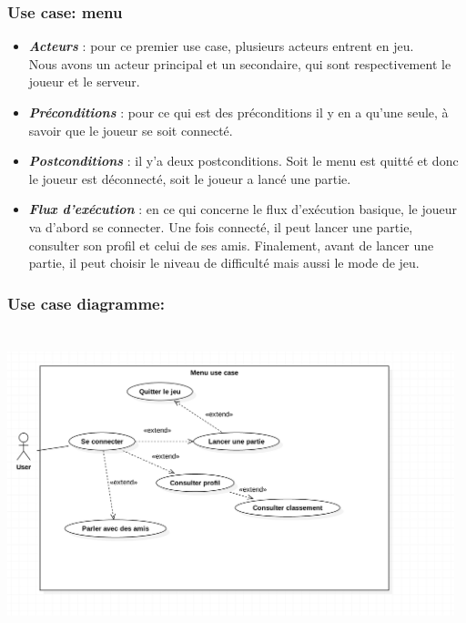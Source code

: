 \documentclass[10pt,a4paper]{article}
\begin{document}
\subsubsection{Use case: menu}
\par
\begin{itemize}
\item \textit{\textbf{Acteurs}} : pour ce premier use case, plusieurs acteurs entrent en jeu.\\
	Nous avons un acteur principal et un secondaire, qui sont respectivement le \gls{joueur} et le \gls{serveur}.\\

\item \textit{\textbf{Préconditions}} :  pour ce qui est des préconditions il y en a qu'une seule, à savoir que le \gls{joueur} se soit connecté.\\

\item \textit{\textbf{Postconditions}} : il y'a deux postconditions. Soit le menu est quitté et donc le \gls{joueur} est déconnecté, soit le \gls{joueur} a lancé une partie.\\

\item \textit{\textbf{Flux d'exécution}} : en ce qui concerne le flux d'exécution basique, le \gls{joueur} va d'abord se connecter. Une fois connecté, il peut lancer une partie, consulter son profil et celui de ses amis. Finalement, avant de lancer une partie, il peut choisir le niveau de difficulté mais aussi le mode de jeu.

\end{itemize}    
\newpage
\subsubsection{Use case diagramme:}
\begin{center}
    \includegraphics[height=9cm,width=13cm]{menu_use_case.png}
\end{center}
\end{document}

